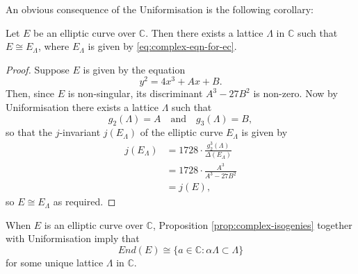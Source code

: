  An obvious consequence of the Uniformisation is the following corollary:

 \begin{cor}
   \label{cor:uniformisation-corollary}
   Let $E$ be an elliptic curve over $\mathbb{C}$.  Then there exists a lattice
   $\Lambda$ in $\mathbb{C}$ such that $E \cong E_{\Lambda}$, where $E_{\Lambda}$ is
   given by \eqref{eq:complex-eqn-for-ec}.
 \end{cor}
 \begin{proof}
   Suppose $E$ is given by the equation
   \begin{equation*}
     y^{2} = 4x^{3} + Ax + B.
   \end{equation*}
   Then, since $E$ is non-singular, its discriminant $A^{3} - 27B^{2}$ is non-zero.
   Now by Uniformisation there exists a lattice $\Lambda$ such that
   \begin{equation*}
     g_{2}(\Lambda) = A \quad \text{and} \quad g_{3}(\Lambda) = B,
   \end{equation*}
   so that the $j$-invariant $j(E_{\Lambda})$ of the elliptic curve $E_{\Lambda}$ is
   given by
   \begin{align*}
     j(E_{\Lambda})&= 1728 \cdot \frac{g_{2}^{3}(\Lambda)}{\Delta(E_{\Lambda})}\\
     &=1728 \cdot \frac{A^{3}}{A^{3} - 27B^{2}}\\
     &=j(E),
   \end{align*}
   so $E \cong E_{\Lambda}$ as required.
 \end{proof}

 When $E$ is an elliptic curve over $\mathbb{C}$, Proposition
 \ref{prop:complex-isogenies} together with Uniformisation imply that
 \begin{equation}
   \label{eq:End(E)-in-complex}
   End(E) \cong \{a \in \mathbb{C} : \alpha \Lambda \subset \Lambda \}
 \end{equation}
 for some unique lattice $\Lambda$ in $\mathbb{C}$.

